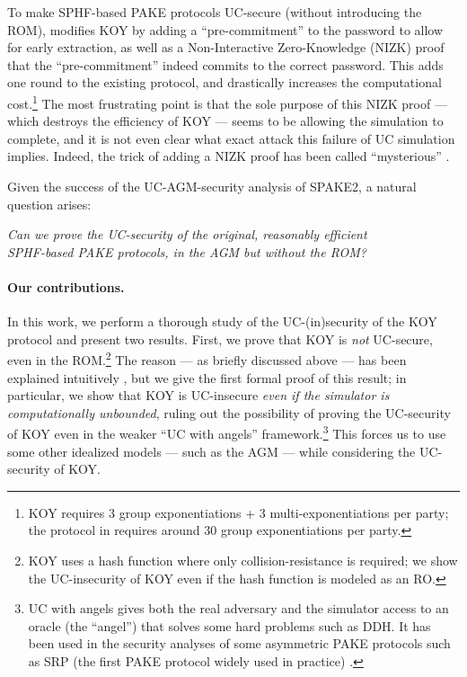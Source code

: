 \begin{enumerate}
      To make SPHF-based PAKE protocols UC-secure (without introducing the ROM), \cite{EC:CHKLM05} modifies KOY by adding a ``pre-commitment'' to the password to allow for early extraction, as well as a Non-Interactive Zero-Knowledge (NIZK) proof that the ``pre-commitment'' indeed commits to the correct password. This adds one round to the existing protocol, and drastically increases the computational cost.\footnote{KOY requires 3 group exponentiations + 3 multi-exponentiations per party; the protocol in \cite{EC:CHKLM05} requires around 30 group exponentiations per party.} The most frustrating point is that the sole purpose of this NIZK proof --- which destroys the efficiency of KOY --- seems to be allowing the simulation to complete, and it is not even clear what exact attack this failure of UC simulation implies. Indeed, the trick of adding a NIZK proof has been called ``mysterious'' \cite[Section~10.5]{pake-sok}.
\end{enumerate}
Given the success of the UC-AGM-security analysis of SPAKE2, a natural question arises:
\begin{displayquote}
\begin{center}
  \emph{Can we prove the UC-security of the original, reasonably efficient \\ SPHF-based PAKE protocols, in the AGM but without the ROM?}
\end{center}
\end{displayquote}

\paragraph{Our contributions.}
In this work, we perform a thorough study of the UC-(in)security of the KOY protocol and present two results. First, we prove that KOY is \emph{not} UC-secure, even in the ROM.\footnote{KOY uses a hash function where only collision-resistance is required; we show the UC-insecurity of KOY even if the hash function is modeled as an RO.} The reason  --- as briefly discussed above --- has been explained intuitively \cite[Section~3.3]{EC:CHKLM05}, but we give the first formal proof of this result; in particular, we show that KOY is UC-insecure \emph{even if the simulator is computationally unbounded}, ruling out the possibility of proving the UC-security of KOY even in the weaker ``UC with angels'' framework.\footnote{UC with angels \cite{STOC:PraSah04} gives both the real adversary and the simulator access to an oracle (the ``angel'') that solves some hard problems such as DDH. It has been used in the security analyses of some asymmetric PAKE protocols such as SRP (the first PAKE protocol widely used in practice) \cite{CSF:DayLeh24}.} This forces us to use some other idealized models --- such as the AGM --- while considering the UC-security of KOY.

